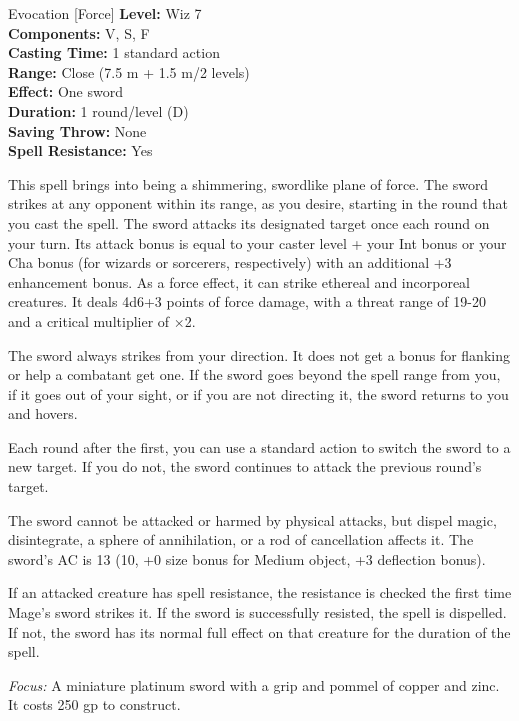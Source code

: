 {Evocation [Force]}
{
	\textbf{Level:}
	Wiz 7\\
	\textbf{Components:}
	V, S, F\\
	\textbf{Casting Time:}
	1 standard action\\
	\textbf{Range:}
	Close (7.5 m + 1.5 m/2 levels)\\
	\textbf{Effect:}
	One sword\\
	\textbf{Duration:}
	1 round/level (D)\\
	\textbf{Saving Throw:}
	None\\
	\textbf{Spell Resistance:}
	Yes\\
}
{
	This spell brings into being a shimmering, swordlike plane of force. The sword strikes at any opponent within its range, as you desire, starting in the round that you cast the spell. The sword attacks its designated target once each round on your turn. Its attack bonus is equal to your caster level + your Int bonus or your Cha bonus (for wizards or sorcerers, respectively) with an additional +3 enhancement bonus. As a force effect, it can strike ethereal and incorporeal creatures. It deals 4d6+3 points of force damage, with a threat range of 19-20 and a critical multiplier of $\times$2.

	The sword always strikes from your direction. It does not get a bonus for flanking or help a combatant get one. If the sword goes beyond the spell range from you, if it goes out of your sight, or if you are not directing it, the sword returns to you and hovers.

	Each round after the first, you can use a standard action to switch the sword to a new target. If you do not, the sword continues to attack the previous round's target.

	The sword cannot be attacked or harmed by physical attacks, but dispel magic, disintegrate, a sphere of annihilation, or a rod of cancellation affects it. The sword's AC is 13 (10, +0 size bonus for Medium object, +3 deflection bonus).

	If an attacked creature has spell resistance, the resistance is checked the first time Mage's sword strikes it. If the sword is successfully resisted, the spell is dispelled. If not, the sword has its normal full effect on that creature for the duration of the spell.

	\textit{Focus:}
	A miniature platinum sword with a grip and pommel of copper and zinc. It costs 250 gp to construct.

}
